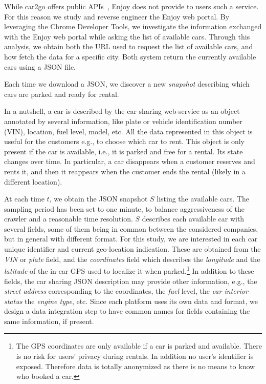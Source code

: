 While car2go offers public APIs~\cite{car2goAPI}, Enjoy does not provide to users such a service. For this reason we study and reverse engineer the Enjoy web portal. By leveraging the Chrome Developer Tools, we investigate the information exchanged with the Enjoy web portal while asking the list of available cars. Through this analysis, we obtain both the URL used to request the list of available cars, and how fetch the data for a specific city.
Both system return the currently available cars using a JSON file.

Each time we download a JSON, we discover a new \textit{snapshot} describing which cars are parked and ready for rental.

In a nutshell, a car is described by the car sharing web-service as an object annotated by several information, like plate or vehicle identification number (VIN), location, fuel level, model, etc. 
All the data represented in this object is useful for the customers e.g., to choose which car to rent.
This object is only present if the car is available, i.e., it is parked and free for a rental. Its state changes over time. In particular, a car disappears when a customer reserves and rents it, and then it reappears when the customer ends the rental (likely in a different location).


At each time $t$, we obtain the JSON snapshot $S$ listing the available cars. 
The sampling period has been set to one minute, to balance aggressiveness of the crawler and a reasonable time resolution.
$S$ describes each available car with several fields, some of them being in common between the considered companies, but in general with different format.
For this study, we are interested in each car unique identifier and current geo-location indication.
These are obtained from the \textit{VIN} or \textit{plate} field, and the \textit{coordinates} field which describes the \textit{longitude} and the \textit{latitude} of the in-car GPS used to localize it when  parked.\footnote{The GPS coordinates are only available if a car is parked and available. There is no risk for users' privacy during rentals. In addition no user's identifier is exposed. Therefore data is totally anonymized as there is no means to know who booked a car.}
In addition to these fields, the car sharing JSON description may provide other information, e.g., the \textit{street address} corresponding to the coordinates, the \textit{fuel} level, the \textit{car interior status} the \textit{engine type}, etc. Since each platform uses its own data and format, we design a data integration step to have common names for fields containing the same information, if present.

